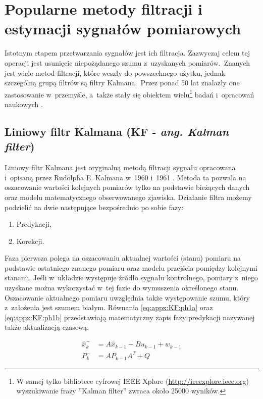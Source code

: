 \chapter{Popularne metody filtracji i estymacji sygnałów pomiarowych}
\label{chap:appx:filters}
Istotnym etapem przetwarzania sygnałów jest ich filtracja. Zazwyczaj celem tej operacji jest usunięcie niepożądanego szumu z~uzyskanych pomiarów.~Znanych jest wiele metod filtracji, które weszły do powszechnego użytku, jednak szczególną grupą filtrów są filtry Kalmana.~Przez ponad 50 lat znalazły one zastosowanie w~przemyśle, a~także stały się obiektem wielu\footnote{W samej tylko bibliotece cyfrowej IEEE Xplore (\url{http://ieeexplore.ieee.org}) wyszukiwanie frazy ''Kalman filter'' zwraca około 25000 wyników.} badań i~opracowań naukowych \cite{Droleta,Welch2006, Kedzierski2007, Huo2014, Pandey2014}.

\section*{Liniowy filtr Kalmana (KF - \emph{ang. Kalman filter})}
\label{sec:appx:filters:KF}
Liniowy filtr Kalmana jest oryginalną metodą filtracji sygnału opracowana i~opisaną przez Rudolpha E. Kalmana w~1960 \cite{Kalman1960} i~1961 \cite{KalmanBucy1961}. Metoda ta pozwala na oszacowanie wartości kolejnych pomiarów tylko na podstawie bieżących danych oraz modelu matematycznego obserwowanego zjawiska. Działanie filtra możemy podzielić na dwie następujące bezpośrednio po sobie fazy: 
\begin{enumerate}
	\item Predykacji,
	\item Korekcji.
\end{enumerate}

Faza pierwsza polega na oszacowaniu aktualnej wartości (stanu) pomiaru na podstawie ostatniego znanego pomiaru oraz modelu przejścia pomiędzy kolejnymi stanami. Jeśli w~układzie występuje źródło sygnału kontrolnego, pomiary z~niego uzyskane można wykorzystać w~tej fazie do wymuszenia określonego stanu. Oszacowanie aktualnego pomiaru uwzględnia także występowanie szumu, który z~założenia jest szumem białym. Równania \ref{eq:appx:KF:ph1a} oraz \ref{eq:appx:KF:ph1b} przedstawiają matematyczny zapis fazy predykacji nazywanej także aktualizacją czasową.

\begin{subequations}
	\begin{align}
		\widehat{x}^-_k & = A\widehat{x}_{k-1} + Bu_{k-1} + w_{k-1}\label{eq:appx:KF:ph1a} \\
		P^-_k           & = AP_{k-1}A^T + Q \label{eq:appx:KF:ph1b}                        
	\end{align}
\end{subequations}

